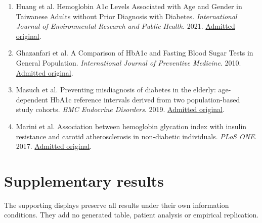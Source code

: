 \documentclass[10pt,twocolumn]{article}
\begin{document}
\begin{enumerate}
\item Huang et al. Hemoglobin A1c Levels Associated with Age and Gender in Taiwanese Adults without Prior Diagnosis with Diabetes. \emph{International Journal of Environmental Research and Public Health}. 2021. \href{https://pmc.ncbi.nlm.nih.gov/articles/PMC8038122/}{Admitted original}.

\item Ghazanfari et al. A Comparison of HbA1c and Fasting Blood Sugar Tests in General Population. \emph{International Journal of Preventive Medicine}. 2010. \href{https://pmc.ncbi.nlm.nih.gov/articles/PMC3075530/}{Admitted original}.

\item Masuch et al. Preventing misdiagnosis of diabetes in the elderly: age-dependent HbA1c reference intervals derived from two population-based study cohorts. \emph{BMC Endocrine Disorders}. 2019. \href{https://pmc.ncbi.nlm.nih.gov/articles/PMC6371438/}{Admitted original}.

\item Marini et al. Association between hemoglobin glycation index with insulin resistance and carotid atherosclerosis in non-diabetic individuals. \emph{PLoS ONE}. 2017. \href{https://pmc.ncbi.nlm.nih.gov/articles/PMC5398507/}{Admitted original}.

\end{enumerate}

\endgroup

\clearpage

\onecolumn

\section*{Supplementary results}

\setcounter{figure}{0}

\renewcommand{\thefigure}{S\arabic{figure}}

\setcounter{table}{0}

\renewcommand{\thetable}{S\arabic{table}}

The supporting displays preserve all results under their own information conditions. They add no generated table, patient analysis or empirical replication.
\end{document}
